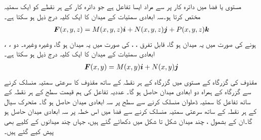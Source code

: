 مستوی یا فضا میں دائرہ کار پر   سے مراد ایسا تفاعل ہے جو دائرہ کار کے ہر نقطے  کو ایک سمتیہ مختص کرتا ہو۔سہ ابعادی سمتیات کے میدان کا ایک کلیہ درج ذیل ہو سکتا ہے۔
\begin{align*}
{\ensuremath{{\boldsymbol{F}}}}(x,y,z)=M(x,y,z){\boldsymbol{i}}+N(x,y,z){\boldsymbol{j}}+P(x,y,z){\boldsymbol{k}}
\end{align*}
، ،  ہونے کی صورت میں یہ میدان  ہو گا، قابل تفرق ، ،  کی صورت میں یہ میدان   ہو گا، وغیرہ وغیرہ۔ دو ابعادی سمتیات کے میدان کا ایک کلیہ درج ذیل ہو سکتا ہے۔
\begin{align*}
{\ensuremath{{\boldsymbol{F}}}}(x,y)=M(x,y){\boldsymbol{i}}+N(x,y){\boldsymbol{j}}
\end{align*}
مقذوف کی گزرگاہ کے مستوی میں  گزرگاہ کے ہر نقطہ کے ساتھ مقذوف  کا سرعتی سمتیہ منسلک کرنے سے گزرگاہ  کے ہمراہ دو ابعادی میدان حاصل ہو گا۔  عددیہ تفاعل کی ہم قیمت سطح کے ہر نقطہ کے ساتھ  تفاعل کا سمتیہ ڈھلوان منسلک کرنے سے سطح پر سہ ابعادی میدان حاصل ہو گا۔   متحرک سیال کے ہر نقطہ کے ساتھ سرعتی سمتیہ منسلک کرنے سے فضا میں اس خطہ پر سہ ابعادی  میدان حاصل ہو گا۔ان کے  بشمول  ، چند  میدان  شکل  تا شکل  میں دکھائے گئے ہیں،  جہاں چند میدانوں کے کلیے بھی پیش کیے  گئے ہیں۔
 
